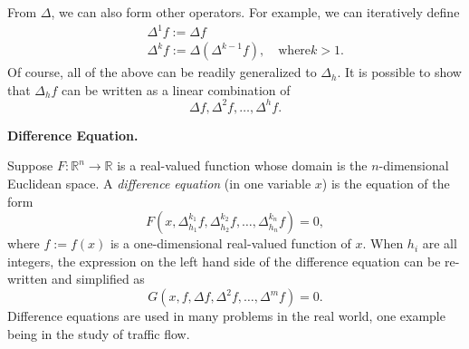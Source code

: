 \documentclass[12pt]{article}
\begin{document}
From $\Delta$, we can also form other operators.  For example, we
can iteratively define
\begin{eqnarray}
&&\Delta^{1}f:=\Delta f \\
&&\Delta^{k}f:=\Delta(\Delta^{k-1}f),\quad\mbox{where
}k>1.
\end{eqnarray}
Of course, all of the above can be readily generalized to $\Delta_h$.
It is possible to show that $\Delta_h f$ can be written as a linear combination of $$\Delta f,\Delta^2 f,\ldots,\Delta^h f.$$

\textbf{Difference Equation.}

Suppose $F\colon\mathbb{R}^n\to\mathbb{R}$ is a real-valued function
whose domain is the $n$-dimensional Euclidean space.  A
\emph{difference equation} (in one variable $x$) is the equation of
the form
$$F(x,\Delta_{h_1}^{k_1}f,\Delta_{h_2}^{k_2}f,\ldots,\Delta_{h_n}^{k_n}f)=0,$$
where $f:=f(x)$ is a one-dimensional real-valued function of $x$.
When $h_i$ are all integers, the expression on the left hand side of
the difference equation can be re-written and simplified as
$$G(x,f,\Delta f,\Delta^{2}f,\ldots,\Delta^{m}f)=0.$$
Difference equations are used in many problems in the real world,
one example being in the study of traffic flow.
\end{document}
